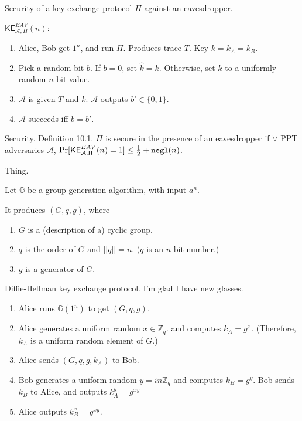 \documentclass[12pt]{article}
\newcommand{\Z}{\mathbb{Z}}
\newcommand{\G}{\mathbb{G}}
\newcommand{\AAA}{\mathcal{A}}
\newcommand{\ExptKEArgs}[3]{\mathsf{KE}_{#1,#2}^{#3}}
\newcommand{\ExptKE}{\ExptKEArgs{\AAA}{\Pi}{EAV}}
\newcommand{\negl}{{\tt negl}}
\begin{document}
Security of a key exchange protocol $\Pi$ against an eavesdropper.

$\ExptKE(n)$:\begin{enumerate}

\item Alice, Bob get $1^n$, and run $\Pi$. Produces trace $T$. Key $k=k_A=k_B$.

\item Pick a random bit $b$. If $b=0$, set $\hat{k}=k$. Otherwise, set $\hat{k}$ to a uniformly random $n$-bit value.

\item $\AAA$ is given $T$ and $k$. $\AAA$ outputs $b'\in\{0,1\}$.

\item $\AAA$ succeeds iff $b=b'$.

\end{enumerate}

Security. Definition 10.1. $\Pi$ is secure in the presence of an eavesdropper if $\forall$ PPT adversaries $\AAA$, $\Pr[\ExptKE(n)=1]\leq\frac{1}{2}+\negl(n)$.

Thing.

Let $\G$ be a group generation algorithm, with input $a^n$.

It produces $(G,q,g)$, where \begin{enumerate}

\item $G$ is a (description of a) cyclic group.

\item $q$ is the order of $G$ and $||q||=n$. ($q$ is an $n$-bit number.)

\item $g$ is a generator of $G$.

\end{enumerate}

Diffie-Hellman key exchange protocol. I'm glad I have new glasses.\begin{enumerate}

\item Alice runs $\G(1^n)$ to get $(G,q,g)$.

\item Alice generates a uniform random $x\in\Z_q$. and computes $k_A=g^x$. (Therefore, $k_A$ is a uniform random element of $G$.)

\item Alice sends $(G,q,g,k_A)$ to Bob.

\item Bob generates a uniform random $y=in\Z_q$ and computes $k_B=g^y$. Bob sends $k_B$ to Alice, and outputs $k_A^y=g^{xy}$

\item Alice outputs $k_B^x=g^{xy}$.

\end{enumerate}
\end{document}
